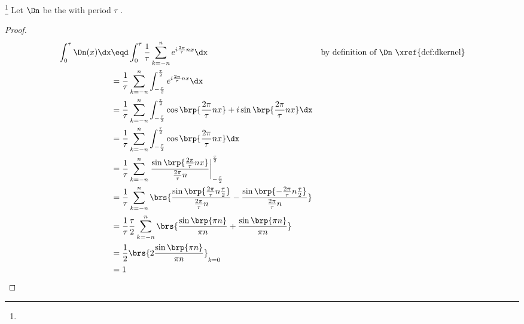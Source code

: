 \begin{proposition}
\footnote{
  }
Let $\Dn$ be the  with period $\tau$ .
\end{proposition}
\begin{proof}
\begin{align*}
  \int_0^\tau \Dn(x) \dx 
         &\eqd \int_0^\tau \frac{1}{\tau} \sum_{k=-n}^n e^{i\frac{2\pi}{\tau}nx} \dx
         &&    \text{by definition of $\Dn$ \xref{def:dkernel}}
       \\&=    \frac{1}{\tau} \sum_{k=-n}^n \int_{-\frac{\tau}{2}}^\frac{\tau}{2} e^{i\frac{2\pi}{\tau}nx} \dx
       \\&=    \frac{1}{\tau} \sum_{k=-n}^n \int_{-\frac{\tau}{2}}^\frac{\tau}{2} \cos\brp{\frac{2\pi}{\tau}nx} + i\sin\brp{\frac{2\pi}{\tau}nx} \dx
       \\&=    \frac{1}{\tau} \sum_{k=-n}^n \int_{-\frac{\tau}{2}}^\frac{\tau}{2} \cos\brp{\frac{2\pi}{\tau}nx} \dx
       \\&=    \frac{1}{\tau} \sum_{k=-n}^n \left. \frac{\sin\brp{\frac{2\pi}{\tau}nx}}{\frac{2\pi}{\tau}n} \right|_{-\frac{\tau}{2}}^\frac{\tau}{2}
       \\&=    \frac{1}{\tau} \sum_{k=-n}^n \brs{
                 \frac{\sin\brp{\frac{2\pi}{\tau}n\frac{\tau}{2}}}{\frac{2\pi}{\tau}n} 
                -\frac{\sin\brp{-\frac{2\pi}{\tau}n\frac{\tau}{2}}}{\frac{2\pi}{\tau}n} 
                }
       \\&=    \frac{1}{\tau}\frac{\tau}{2} \sum_{k=-n}^n \brs{
                 \frac{\sin\brp{\pi n}}{\pi n} 
                +\frac{\sin\brp{\pi n}}{\pi n} 
                }
       \\&=    \frac{1}{2} \brs{
                 2\frac{\sin\brp{\pi n}}{\pi n} 
                }_{k=0}
       \\&=    1
\end{align*}
\end{proof}

